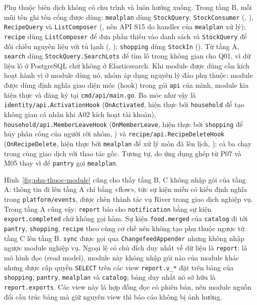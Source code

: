 Phụ thuộc biên dịch không có chu trình và luôn hướng xuống. Trong tầng B, mỗi mũi tên ghi tên cổng được dùng: \texttt{mealplan} dùng \texttt{StockQuery}, \texttt{StockConsumer} (, ), \texttt{RecipeQuery} và \texttt{ListComposer} (, nên API S15 do handler của \texttt{mealplan} xử lý); \texttt{recipe} dùng \texttt{ListComposer} để đưa phần thiếu vào danh sách và \texttt{StockQuery} để đối chiếu nguyên liệu với tủ lạnh (, ); \texttt{shopping} dùng \texttt{StockIn} (). Từ tầng A, \texttt{search} dùng \texttt{StockQuery.SearchLots} để tìm lô trong không gian cho Q01, vì dữ liệu lô ở PostgreSQL chứ không ở Elasticsearch. Khi module được dùng cần kích hoạt hành vi ở module dùng nó, nhóm áp dụng nguyên lý đảo phụ thuộc: module được dùng định nghĩa giao diện móc (hook) trong gói \texttt{api} của mình, module kia hiện thực và đăng ký tại \texttt{cmd/api/main.go}. Ba móc như vậy là \texttt{identity/api.ActivationHook} (\texttt{OnActivated}, hiện thực bởi \texttt{household} để tạo không gian cá nhân khi A02 kích hoạt tài khoản), \texttt{household/api.MemberLeaveHook} (\texttt{OnMemberLeave}, hiện thực bởi \texttt{shopping} để hủy phân công của người rời nhóm, ) và \texttt{recipe/api.RecipeDeleteHook} (\texttt{OnRecipeDelete}, hiện thực bởi \texttt{mealplan} để xử lý món đã lên lịch, ); cả ba chạy trong cùng giao dịch với thao tác gốc. Tương tự,  do ứng dụng ghép từ P07 và M05 thay vì để \texttt{pantry} gọi \texttt{mealplan}.


Hình~\ref{fig:phu-thuoc-module} cũng cho thấy tầng B, C không nhập gói của tầng A: thông tin đi lên tầng A chỉ bằng «flow», tức sự kiện miền có kiểu định nghĩa trong \texttt{platform/events}, được chèn thành tác vụ River trong giao dịch nghiệp vụ. Trong tầng A cũng vậy: \texttt{report} báo cho \texttt{notification} bằng sự kiện \texttt{export.completed} chứ không gọi hàm. Sự kiện \texttt{food.merged} của \texttt{catalog} đi tới \texttt{pantry}, \texttt{shopping}, \texttt{recipe} theo cùng cơ chế nên không tạo phụ thuộc ngược từ tầng C lên tầng B. \texttt{sync} được gọi qua \texttt{ChangefeedAppender} nhưng không nhập ngược module nghiệp vụ. Ngoại lệ có chủ đích duy nhất về dữ liệu là \texttt{report}: là mô hình đọc (read model), module này không nhập gói nào của module khác nhưng được cấp quyền \texttt{SELECT} trên các view \texttt{report.v\_*} đặt trên bảng của \texttt{shopping}, \texttt{pantry}, \texttt{mealplan} và \texttt{catalog}; bảng duy nhất nó sở hữu là \texttt{report.exports}. Các view này là hợp đồng đọc có phiên bản, nên module nguồn đổi cấu trúc bảng mà giữ nguyên view thì báo cáo không bị ảnh hưởng.


